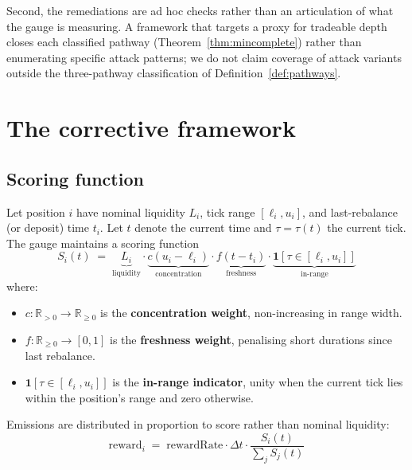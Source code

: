 \documentclass[11pt,a4paper]{article}
\theoremstyle{cgdefinition}
\theoremstyle{cgplain}
\theoremstyle{cgremark}
\begin{document}
Second, the remediations are ad hoc checks rather than an articulation of what the gauge is measuring. A framework that targets a proxy for tradeable depth closes each classified pathway (Theorem~\ref{thm:mincomplete}) rather than enumerating specific attack patterns; we do not claim coverage of attack variants outside the three-pathway classification of Definition~\ref{def:pathways}.

\section{The corrective framework}\label{sec:framework}

\subsection{Scoring function}\label{sec:scoring}

Let position $i$ have nominal liquidity $L_i$, tick range $[\ell_i, u_i]$, and last-rebalance (or deposit) time $t_i$. Let $t$ denote the current time and $\tau = \tau(t)$ the current tick. The gauge maintains a scoring function
\begin{equation}\label{eq:score}
S_i(t) \;=\; \underbrace{L_i}_{\text{liquidity}} \cdot \underbrace{c(u_i - \ell_i)}_{\text{concentration}} \cdot \underbrace{f(t - t_i)}_{\text{freshness}} \cdot \underbrace{\mathbf{1}[\tau \in [\ell_i, u_i]]}_{\text{in-range}}
\end{equation}
where:

\begin{itemize}[leftmargin=2em]
\item $c : \mathbb{R}_{>0} \to \mathbb{R}_{\geq 0}$ is the \textbf{concentration weight}, non-increasing in range width.
\item $f : \mathbb{R}_{\geq 0} \to [0, 1]$ is the \textbf{freshness weight}, penalising short durations since last rebalance.
\item $\mathbf{1}[\tau \in [\ell_i, u_i]]$ is the \textbf{in-range indicator}, unity when the current tick lies within the position's range and zero otherwise.
\end{itemize}

Emissions are distributed in proportion to score rather than nominal liquidity:
\begin{equation}\label{eq:reward}
\text{reward}_i \;=\; \text{rewardRate} \cdot \Delta t \cdot \frac{S_i(t)}{\sum_j S_j(t)}
\end{equation}
\end{document}
